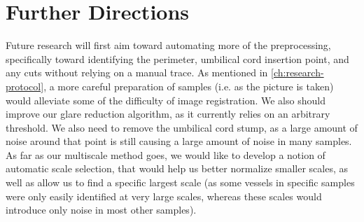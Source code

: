 \section{Further Directions}

Future research will first aim toward automating more of the preprocessing, specifically toward identifying the perimeter, umbilical cord insertion point, and any cuts without relying on a manual trace.  As mentioned in \cref{ch:research-protocol}, a more careful preparation of samples (i.e. as the picture is taken) would alleviate some of the difficulty of image registration. We also should improve our glare reduction algorithm, as it currently relies on an arbitrary threshold. We also need to remove the umbilical cord stump, as a large amount of noise around that point is still causing a large amount of noise in many samples. As far as our multiscale method goes, we would like to develop a notion of automatic scale selection, that would help us better normalize smaller scales, as well as allow us to find a specific largest scale (as some vessels in specific samples were only easily identified at very large scales, whereas these scales would introduce only noise in most other samples).
